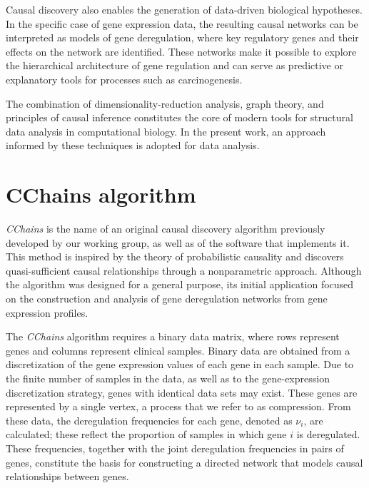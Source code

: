 \documentclass[12pt,a4paper]{report}
\begin{document}
Causal discovery also enables the generation of data-driven biological hypotheses. In the specific case of gene expression data, the resulting causal networks can be interpreted as models of gene deregulation, where key regulatory genes and their effects on the network are identified\cite{cascades}. These networks make it possible to explore the hierarchical architecture of gene regulation and can serve as predictive or explanatory tools for processes such as carcinogenesis.

The combination of dimensionality-reduction analysis, graph theory, and principles of causal inference constitutes the core of modern tools for structural data analysis in computational biology\cite{friedman}. In the present work, an approach informed by these techniques is adopted for data analysis.




\section{CChains algorithm}
\label{sec:cchains}

\textit{CChains} is the name of an original causal discovery algorithm previously developed by our working group\cite{parametric}, as well as of the software that implements it\cite{github}. This method is inspired by the theory of probabilistic causality\cite{caus} and discovers quasi-sufficient causal relationships through a nonparametric approach. Although the algorithm was designed for a general purpose, its initial application focused on the construction and analysis of gene deregulation networks from gene expression profiles\cite{cascades}.


The \textit{CChains} algorithm requires a binary data matrix, where rows represent genes and columns represent clinical samples. Binary data are obtained from a discretization of the gene expression values of each gene in each sample. Due to the finite number of samples in the data, as well as to the gene-expression discretization strategy, genes with identical data sets may exist. These genes are represented by a single vertex, a process that we refer to as compression. From these data, the deregulation frequencies for each gene, denoted as \( \nu_i \), are calculated; these reflect the proportion of samples in which gene \( i \) is deregulated. These frequencies, together with the joint deregulation frequencies in pairs of genes, constitute the basis for constructing a directed network that models causal relationships between genes.
\end{document}

